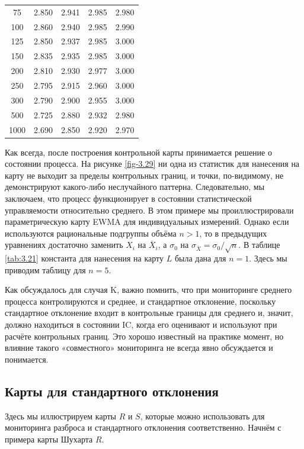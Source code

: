 \begin{table}[htbp]
\begin{tabular}{ccccc}
		75   & 2.850 & 2.941 & 2.985 & 2.980 \\
		100  & 2.860 & 2.940 & 2.985 & 2.990 \\
		125  & 2.850 & 2.937 & 2.985 & 3.000 \\
		150  & 2.835 & 2.935 & 2.985 & 3.000 \\
		200  & 2.810 & 2.930 & 2.977 & 3.000 \\
		250  & 2.795 & 2.915 & 2.960 & 3.000 \\
		300  & 2.790 & 2.900 & 2.955 & 3.000 \\
		500  & 2.725 & 2.880 & 2.932 & 2.980 \\
		1000 & 2.690 & 2.850 & 2.920 & 2.970 \\
		\bottomrule
	\end{tabular}
\end{table}

Как всегда, после построения контрольной карты принимается решение о состоянии процесса. На рисунке \ref{fig-3.29} ни одна из статистик для нанесения на карту не выходит за пределы контрольных границ, и точки, по-видимому, не демонстрируют какого-либо неслучайного паттерна. Следовательно, мы заключаем, что процесс функционирует в состоянии статистической управляемости относительно среднего.
В этом примере мы проиллюстрировали параметрическую карту EWMA для индивидуальных измерений. Однако если используются рациональные подгруппы объёма \(n > 1\), то в предыдущих уравнениях достаточно заменить \(X_i\) на \(\overline{X}_i\), а \(\sigma_0\) на \(\sigma_{\overline{X}} = \sigma_0/\sqrt{n}\). В таблице \ref{tab:3.21} константа для нанесения на карту \(L\) была дана для \(n = 1\). Здесь мы приводим таблицу для \(n = 5\).

Как обсуждалось для случая K, важно помнить, что при мониторинге среднего процесса контролируются и среднее, и стандартное отклонение, поскольку стандартное отклонение входит в контрольные границы для среднего и, значит, должно находиться в состоянии IC, когда его оценивают и используют при расчёте контрольных границ. Это хорошо известный на практике момент, но влияние такого «совместного» мониторинга не всегда явно обсуждается и понимается.

\subsection{Карты для стандартного отклонения}

Здесь мы иллюстрируем карты \(R\) и \(S\), которые можно использовать для мониторинга разброса и стандартного отклонения соответственно. Начнём с примера карты Шухарта \(R\).

